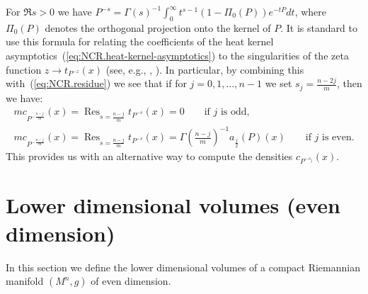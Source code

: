 \documentclass[leqno, 10pt]{amsart}
\theoremstyle{remark}
\begin{document}
For $\Re s>0$ we have 
$P^{-s}=\Gamma(s)^{-1}\int_{0}^{\infty}t^{s-1}(1-\Pi_{0}(P))e^{-tP}dt$,
where $\Pi_{0}(P)$ denotes the orthogonal projection onto the kernel of $P$. It is standard to use this formula for relating the coefficients of the 
heat kernel asymptotics~(\ref{eq:NCR.heat-kernel-asymptotics}) to the singularities of the zeta function $z\rightarrow t_{P^{-z}}(x)$ (see, e.g., 
\cite{Gi:ITHEASIT}, \cite{Wo:NCRF}). 
In particular, by combining this with~(\ref{eq:NCR.residue}) we see that if for $j=0,1,\ldots,n-1$ we set 
$s_{j}=\frac{n-2j}{m}$, then we have:
\begin{gather}
    mc_{P^{-\frac{n-j}{m}}}(x)={\ensuremath{{\operatorname{{Res}}}}}_{s=\frac{n-j}{m}}t_{P^{-s}}(x)=0 \qquad \text{if $j$ is odd}, \label{eq:NCR.NCR-heat-kernel-asymptotics1}\\
     mc_{P^{-\frac{n-j}{m}}}(x)={\ensuremath{{\operatorname{{Res}}}}}_{s=\frac{n-j}{m}}t_{P^{-s}}(x)=\Gamma(\frac{n-j}{m})^{-1}a_{\frac{j}{2}}(P)(x) \qquad \text{if $j$ is even}.
    \label{eq:NCR.NCR-heat-kernel-asymptotics2} 
\end{gather}    
This provides us with an alternative way to compute the densities $c_{P^{-s_{j}}}(x)$. 

\section{Lower dimensional volumes (even dimension)}
\label{sec:even-dimension}
In this section we  define the  lower dimensional volumes of a compact Riemannian manifold $(M^{n},g)$ of even dimension. 
\end{document}
